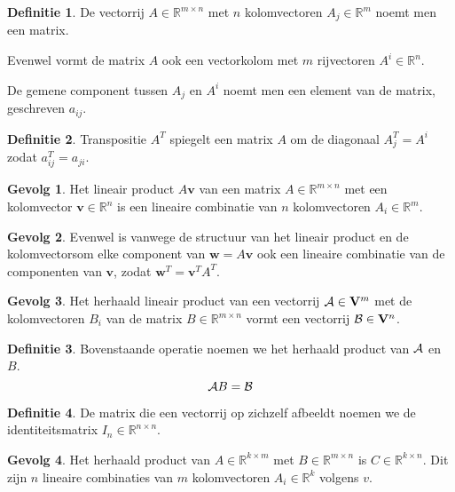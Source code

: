 \documentclass{amsart}
\theoremstyle{definition}
\newtheorem{dfn}{Definitie}[section]
\newtheorem{csq}{Gevolg}[section]
\newcommand{\realnums}{\mathbb{R}}
\newcommand{\realn}[1][n]{\realnums^{#1}}
\newcommand{\realmx}[2][n]{\realn[#2 \times #1]}
\newcommand{\realnxn}{\realmx{n}}
\newcommand{\realmxn}{\realmx{m}}
\newcommand{\vecspace}[1][v]{\mathrm{\mathbf{\MakeUppercase#1}}}
\newcommand{\vecspacen}[1][n]{\vecspace^#1}
\newcommand{\vvec}[1][v]{\mathbf{#1}}
\newcommand{\vecrow}[1][a]{\mathcal{\MakeUppercase{#1}}}
\begin{document}
\begin{dfn}
	De vectorrij $A \in \realn[m \times n]$ met $n$ kolomvectoren $A_{j} \in \realn[m]$ noemt men een matrix.

	Evenwel vormt de matrix $A$ ook een vectorkolom met $m$ rijvectoren $A^i \in \realn$. 

	De gemene component tussen $A_j$ en $A^i$ noemt men een element van de matrix, geschreven $a_{ij}$.
\end{dfn}

\begin{dfn}
	Transpositie $A^T$ spiegelt een matrix $A$ om de diagonaal $A^T_j = A^i$ zodat $a^T_{ij} = a_{ji}$.
\end{dfn}

\begin{csq}
	Het lineair product $A\vvec$ van een matrix $A \in \realmxn$ met een kolomvector $\vvec \in \realn$ is een lineaire combinatie van $n$ kolomvectoren $A_i \in \realn[m]$.
\end{csq}

\begin{csq}
	Evenwel is vanwege de structuur van het lineair product en de kolomvectorsom elke component van $\vvec[w] = A\vvec$ ook een lineaire combinatie van de componenten van $\vvec$, zodat $\vvec[w]^T = \vvec^TA^T$.
\end{csq}

\begin{csq}
	Het herhaald lineair product van een vectorrij $\vecrow \in \vecspacen[m]$ met de kolomvectoren $B_i$ van de matrix $B \in \realmxn$ vormt een vectorrij $\vecrow[b] \in \vecspacen$.
\end{csq}

\begin{dfn}
	Bovenstaande operatie noemen we het herhaald product van $\vecrow$ en $B$.
	\begin{equation*}
		\vecrow B = \vecrow[b]
	\end{equation*}
\end{dfn}

\begin{dfn}
	De matrix die een vectorrij op zichzelf afbeeldt noemen we de identiteitsmatrix $I_n \in \realnxn$.
\end{dfn}

\begin{csq}
	Het herhaald product van $A \in \realmx[m]{k}$ met $B \in \realmxn$ is $C \in \realmx[n]{k}$.
	Dit zijn $n$ lineaire combinaties van $m$ kolomvectoren $A_i \in \realn[k]$ volgens $v$.
\end{csq}
\end{document}
